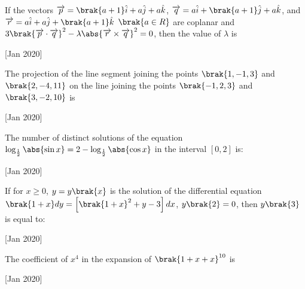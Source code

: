 \iffalse
	\title{2020}
	\author{AI24BTECH11003}
	\section{integer}
\fi

    \item If the vectors $\overrightarrow{p} = \brak{a+1}\hat{i}+a\hat{j}+a\hat{k}$, $\overrightarrow{q} = a\hat{i}+\brak{a+1}\hat{j}+a\hat{k}$, and $\overrightarrow{r} = a\hat{i}+a\hat{j}+\brak{a+1}\hat{k}$ $\brak{a\in R}$ are coplanar and $3\brak{\overrightarrow{p}\cdot\overrightarrow{q}}^2 - \lambda\abs{\overrightarrow{r}\times \overrightarrow{q}}^2=0$, then the value of $\lambda$ is
    
    \hfill[Jan 2020]

    \item The projection of the line segment joining the points $\brak{1,-1,3}$ and $\brak{2,-4,11}$ on the line joining the points $\brak{-1,2,3}$ and $\brak{3,-2,10}$ is
    
    \hfill[Jan 2020]
		
    \item The number of distinct solutions of the equation $\log_{\frac{1}{2}}\abs{\sin x} = 2-\log_{\frac{1}{2}}\abs{\cos x}$ in the interval $\left[0, 2\right]$ is:
    
    \hfill[Jan 2020]

    \item If for $x\geq 0$, $y=y\brak{x}$ is the solution of the differential equation $\brak{1+x}dy=\left[ \brak{1+x}^2 +y-3\right]dx$, $y\brak{2}=0$, then $y\brak{3}$ is equal to:
    
    \hfill[Jan 2020]
	
    \item The coefficient of $x^4$ in the expansion of $\brak{1+x+x}^{10}$ is
    
    \hfill[Jan 2020]


